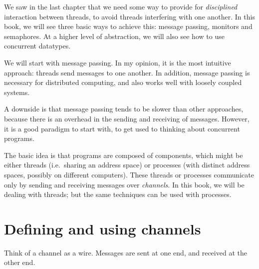 We saw in the last chapter that we need some way to provide for
\emph{disciplined} interaction between threads, to avoid threads interfering
with one another.  In this book, we will see three basic ways to achieve this:
message passing, monitors and semaphores.  At a higher level of abstraction,
we will also see how to use concurrent datatypes.

We will start with message passing.  In my opinion, it is the most intuitive
approach: threads send messages to one another.  In addition, message passing
is necessary for distributed computing, and also works well with loosely
coupled systems.

A downside is that message passing tends to be slower than other approaches,
because there is an overhead in the sending and receiving of messages.
However, it is a good paradigm to start with, to get used to thinking about
concurrent programs.

The basic idea is that programs are composed of components, which might be
either threads (i.e.~sharing an address space) or processes (with distinct
address spaces, possibly on different computers).  These threads or processes
communicate only by sending and receiving messages over \emph{channels}.  In
this book, we will be dealing with threads; but the same techniques can be
used with processes.


\section{Defining and using channels}

Think of a channel as a wire.  Messages are sent at one end, and received at
the other end.



